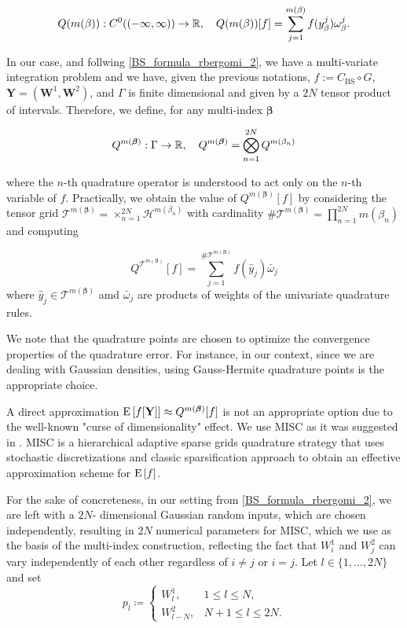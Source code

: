 \begin{equation}
Q(m(\beta)):C^0((-\infty,\infty)) \rightarrow \mathbb{R}, \quad Q(m(\beta))[f]= \sum_{j=1}^{m(\beta)} f(y^j_\beta) \omega_\beta^j.
\end{equation}





In our case, and follwing \eqref{BS_formula_rbergomi_2}, we have a multi-variate integration problem and  we have, given the previous notations,    $f:=C_{\text{BS}}\circ G$, $\mathbf{Y}=(\mathbf{W}^1,\mathbf{W}^2)$, and  $\Gamma$  is finite dimensional and given by a $2N$ tensor product of intervals.  Therefore,  we define, for any multi-index $\boldsymbol{\beta}$

$$Q^{m(\boldsymbol{\beta})}: \Gamma \rightarrow \mathbb{R},\quad  Q^{m(\boldsymbol{\beta})}= \bigotimes_{n = 1}^{2N} Q^{m(\beta_n)} $$

where the $n$-th quadrature operator is understood to act only on the $n$-th variable of $f$. Practically, we obtain the value of $Q^{m(\boldsymbol{\beta})}[f]$  by considering the tensor grid $\mathcal{T}^{m(\boldsymbol{\beta})}= \times_{n = 1}^{2N}  \mathcal{H}^{m(\beta_n)}$ with cardinality $\#\mathcal{T}^{m(\boldsymbol{\beta})}=\prod_{n=1}^{2N} m (\beta_n)$ and computing

$$ Q^{\mathcal{T}^{m(\boldsymbol{\beta})}}[f]= \sum_{j=1}^{\#\mathcal{T}^{m(\boldsymbol{\beta})}} f(\hat{y}_j) \bar{\omega}_j$$
where $\hat{y}_j \in \mathcal{T}^{m(\boldsymbol{\beta})}$ amd $\bar{\omega}_j$ are  products of weights of the univariate quadrature rules.
\begin{remark}
We note that the quadrature points are chosen to optimize the convergence properties of the quadrature error.  For instance, in our context, since we are dealing with Gaussian densities, using Gauss-Hermite quadrature points is the appropriate choice.
\end{remark}

A direct approximation $\mathrm{E}\left[f[\mathbf{Y}]\right] \approx Q^{m(\boldsymbol{\beta})}[f]$ is not an appropriate option  due to the well-known "curse of dimensionality" effect. We use MISC as it was suggested  in \cite{haji2016multi}. MISC is a hierarchical adaptive sparse grids quadrature strategy that uses  stochastic discretizations  and classic sparsification approach to obtain an effective approximation scheme for $\mathrm{E}\left[f\right]$. 

 For the sake
of concreteness, in our setting from \eqref{BS_formula_rbergomi_2}, we are left with a $2N$- dimensional Gaussian random inputs, which are chosen independently, resulting in  $2N$ numerical parameters for MISC, which we use as the basis of the multi-index construction, reflecting the fact that $W^1_i$ and $W^2_j$ can vary independently of each other regardless of $i \neq j$ or $i = j$. Let $l \in \{1, \ldots, 2N\}$ and set
\begin{equation}
p_l \coloneqq
\begin{cases}
W^1_l, & 1 \le l \le N,\\
W^2_{l-N}, & N+1 \le l \le 2N.
\end{cases}
\end{equation}


